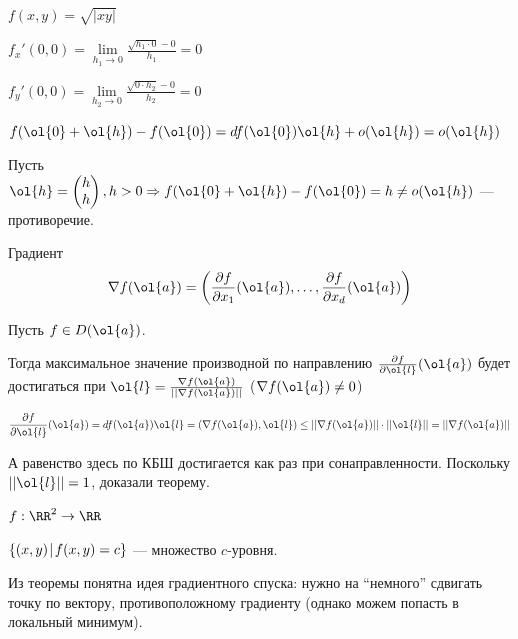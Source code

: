 \begin{example}{}{}
    \( f(x, y) = \sqrt{ |xy| } \)

    \( f_x'(0, 0) = \lim\limits_{h_1 \to 0} \frac{\sqrt{h_1 \cdot 0} - 0}{h_1} = 0 \)

    \( f_y'(0, 0) = \lim\limits_{h_2 \to 0} \frac{\sqrt{0 \cdot h_2} - 0}{h_2} = 0 \)

    \( f(\ol{0} + \ol{h}) - f(\ol{0}) = df(\ol{0}) \ol{h} + o(\ol{h}) = o(\ol{h}) \)

    Пусть
    \(
        \ol{h} = \begin{pmatrix}
            h
            \\
            h
        \end{pmatrix},
        h > 0
        \Rightarrow
        f(\ol{0} + \ol{h}) - f(\ol{0}) = h \neq o(\ol{h})
    \) --- противоречие.
\end{example}

\begin{defn}{Градиент}{}
    \[
        \nabla f (\ol{a}) = \left( \frac{\partial f}{\partial x_1} (\ol{a}), \ldots, \frac{\partial f}{\partial x_d} (\ol{a}) \right)
    \]
\end{defn}

\begin{thrm}{}{}
    Пусть \( f \in D(\ol{a}) \).

    Тогда максимальное значение производной по направлению \( \frac{\partial f}{\partial \ol{l}} (\ol{a}) \)
    будет достигаться при \( \ol{l} = \frac{\nabla f(\ol{a})}{|| \nabla f(\ol{a}) ||} \) (\( \nabla f(\ol{a}) \neq 0 \))
\end{thrm}

\[
    \frac{\partial f}{\partial \ol{l}} (\ol{a}) = df(\ol{a}) \ol{l} = (\nabla f(\ol{a}), \ol{l})
    \leq
    || \nabla f(\ol{a}) || \cdot || \ol{l} ||
    =
    || \nabla f(\ol{a}) ||
\]

А равенство здесь по КБШ достигается как раз при сонаправленности.
Поскольку \( || \ol{l} || = 1 \), доказали теорему.

\begin{defn}{}{}
    \( f : \RR^2 \to \RR \)

    \( \{ (x, y) \: \vline \: f(x, y) = c \} \) --- множество \( c \)-уровня.
\end{defn}

Из теоремы понятна идея градиентного спуска: нужно на ``немного'' сдвигать точку
по вектору, противоположному градиенту (однако можем попасть в локальный минимум).

